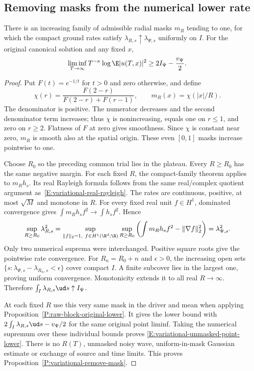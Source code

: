 \subsection{Removing masks from the numerical lower rate}

\begin{proposition}
  \label{P:variational-remove-mask}
  There is an increasing family of admissible radial masks $m_R$
  tending to one, for which the compact ground rates satisfy
  $\lambda_{R,s}\uparrow\lambda_{\Psi,s}$ uniformly on $I$.
  For the original canonical solution and any fixed $x$,
  \begin{equation}\label{E:variational-unmasked-point-lower}
    \liminf_{T\to\infty}T^{-\kappa}\log\E|u(T,x)|^2
    \ge2I_\Psi-\frac{v_\Psi}{2}.
  \end{equation}
\end{proposition}

\begin{proof}
  Put $F(t)=e^{-1/t}$ for $t>0$ and zero otherwise, and define
  \[
    \chi(r)=\frac{F(2-r)}{F(2-r)+F(r-1)},\qquad
    m_R(x)=\chi(|x|/R).
  \]
  The denominator is positive. The numerator decreases and the
  second denominator term increases; thus $\chi$ is nonincreasing,
  equals one on $r\le1$, and zero on $r\ge2$.
  Flatness of $F$ at zero gives smoothness. Since $\chi$ is
  constant near zero, $m_R$ is smooth also at the spatial origin.
  These even $[0,1]$ masks increase pointwise to one.

  Choose $R_0$ so the preceding common trial lies in the plateau.
  Every $R\ge R_0$ has the same negative margin.
  For each fixed $R$, the compact-family theorem applies to $m_Rh_s$.
  Its real Rayleigh formula follows from the same real/complex
  quotient argument as~\eqref{E:variational-real-rayleigh}.
  The rates are continuous, positive, at most $\sqrt M$ and
  monotone in $R$. For every fixed real unit $f\in H^1$,
  dominated convergence gives $\int m_Rh_sf^2\to\int h_sf^2$.
  Hence
  \[
    \sup_{R\ge R_0}\lambda_{R,s}^2
    =\sup_{\|f\|_2=1,\ f\in H^1(\R^d;\R)}
    \sup_{R\ge R_0}
    \left(\int m_Rh_sf^2-\|\nabla f\|_2^2\right)
    =\lambda_{\Psi,s}^2.
  \]
  Only two numerical suprema were interchanged.
  Positive square roots give the pointwise rate convergence.
  For $R_n=R_0+n$ and $\epsilon>0$, the increasing open sets
  $\{s:\lambda_{\Psi,s}-\lambda_{R_n,s}<\epsilon\}$ cover compact
  $I$. A finite subcover lies in the largest one, proving uniform
  convergence. Monotonicity extends it to all real $R\to\infty$.
  Therefore $\int_I\lambda_{R,s}\ud s\uparrow I_\Psi$.

  At each fixed $R$ use this very same mask in the driver and mean
  when applying Proposition~\ref{P:raw-block-original-lower}.
  It gives the lower bound with $2\int_I\lambda_{R,s}\ud s-v_\Psi/2$
  for the same original point liminf. Taking the numerical supremum
  over these individual bounds proves
  \eqref{E:variational-unmasked-point-lower}.
  There is no $R(T)$, unmasked noisy wave, uniform-in-mask Gaussian
  estimate or exchange of source and time limits.
  This proves Proposition~\ref{P:variational-remove-mask}.
\end{proof}

